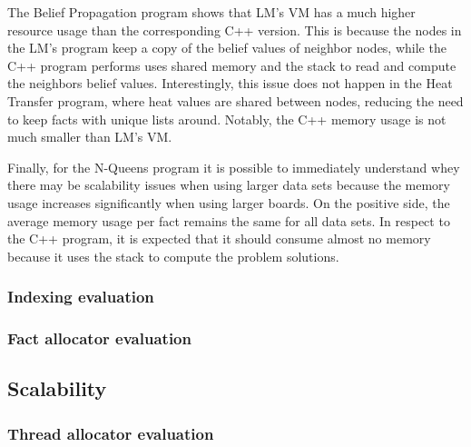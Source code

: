 The Belief Propagation program shows that LM's VM has a much higher resource
usage than the corresponding C++ version. This is because the nodes in the LM's
program keep a copy of the belief values of neighbor nodes, while the C++
program performs uses shared memory and the stack to read and compute the
neighbors belief values. Interestingly, this issue does not happen in the Heat
Transfer program, where heat values are shared between nodes, reducing the need
to keep facts with unique lists around. Notably, the C++ memory usage is not
much smaller than LM's VM.

Finally, for the N-Queens program it is possible to immediately understand whey
there may be scalability issues when using larger data sets because the memory
usage increases significantly when using larger boards. On the positive side,
the average memory usage per fact remains the same for all data sets. In respect
to the C++ program, it is expected that it should consume almost no memory
because it uses the stack to compute the problem solutions.
\subsubsection{Indexing evaluation}

\subsubsection{Fact allocator evaluation}

\subsection{Scalability}

\subsubsection{Thread allocator evaluation}

